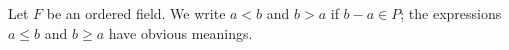Let $F$ be an ordered field. We write $a < b$ and $b > a$ if $b - a \in P$; the expressions $a \leq b$ and $b \geq a$ have obvious meanings.
